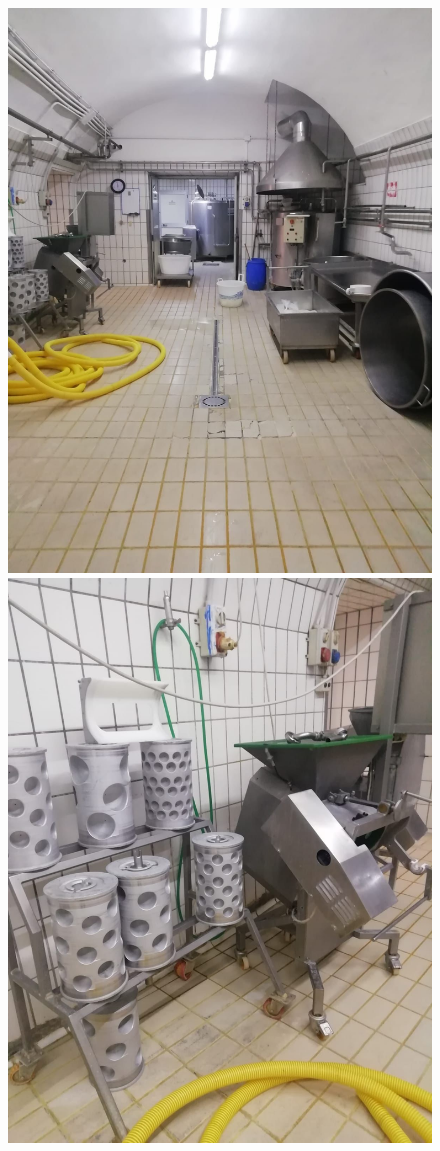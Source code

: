 \documentclass[12pt]{report}
\begin{document}
\begin{figure}[H]
\includegraphics[scale=0.10]{imgs/photos/img5.jpeg}
\includegraphics[scale=0.10]{imgs/photos/img6.jpeg}

\end{figure}
\end{document}
